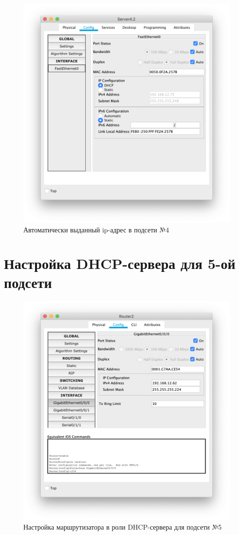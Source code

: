 \begin{figure}[H]
    \centering
    \includegraphics[width=0.7\linewidth]{images/net_4_macine.png}
    \caption{Автоматически выданный ip-адрес в подсети №4}%
\end{figure}

\section{Настройка DHCP-сервера для 5-ой подсети}%
\label{sec:4_net}

\begin{figure}[H]
    \centering
    \includegraphics[width=0.8\linewidth]{images/router2_net_5.png}
    \caption{Настройка маршрутизатора в роли DHCP-сервера для подсети №5}%
\end{figure}

